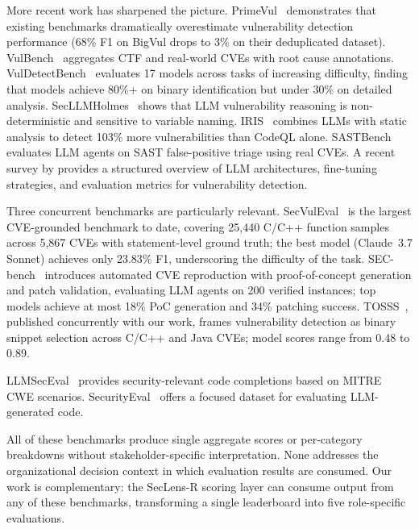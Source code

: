 \documentclass[10pt,twocolumn]{article}
\newcommand{\framework}{SecLens-R\xspace}
\begin{document}
More recent work has sharpened the picture. PrimeVul~\citep{ding2024primevul} demonstrates that existing benchmarks dramatically overestimate vulnerability detection performance (68\% F1 on BigVul drops to 3\% on their deduplicated dataset). VulBench~\citep{gao2023vulbench} aggregates CTF and real-world CVEs with root cause annotations. VulDetectBench~\citep{liu2024vuldetectbench} evaluates 17 models across tasks of increasing difficulty, finding that models achieve 80\%+ on binary identification but under 30\% on detailed analysis. SecLLMHolmes~\citep{ullah2024secllmholmes} shows that LLM vulnerability reasoning is non-deterministic and sensitive to variable naming. IRIS~\citep{li2024iris} combines LLMs with static analysis to detect 103\% more vulnerabilities than CodeQL alone. SASTBench~\citep{feiglin2025sastbench} evaluates LLM agents on SAST false-positive triage using real CVEs. A recent survey by \citet{sheng2025llmsurvey} provides a structured overview of LLM architectures, fine-tuning strategies, and evaluation metrics for vulnerability detection.

Three concurrent benchmarks are particularly relevant. SecVulEval~\citep{lu2025secvuleval} is the largest CVE-grounded benchmark to date, covering 25,440 C/C++ function samples across 5,867 CVEs with statement-level ground truth; the best model (Claude~3.7 Sonnet) achieves only 23.83\% F1, underscoring the difficulty of the task. SEC-bench~\citep{lee2025secbench} introduces automated CVE reproduction with proof-of-concept generation and patch validation, evaluating LLM agents on 200 verified instances; top models achieve at most 18\% PoC generation and 34\% patching success. TOSSS~\citep{damie2026tosss}, published concurrently with our work, frames vulnerability detection as binary snippet selection across C/C++ and Java CVEs; model scores range from 0.48 to 0.89.

LLMSecEval~\citep{tony2023llmseceval} provides security-relevant code completions based on MITRE CWE scenarios. SecurityEval~\citep{siddiq2022securityeval} offers a focused dataset for evaluating LLM-generated code.

All of these benchmarks produce single aggregate scores or per-category breakdowns without stakeholder-specific interpretation. None addresses the organizational decision context in which evaluation results are consumed. Our work is complementary: the \framework scoring layer can consume output from any of these benchmarks, transforming a single leaderboard into five role-specific evaluations.
\end{document}
